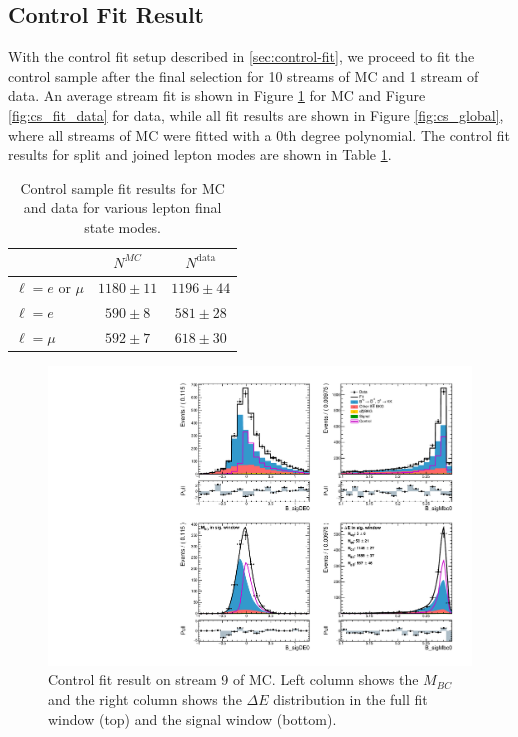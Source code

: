 \subsection{Control Fit Result}
With the control fit setup described in \ref{sec:control-fit}, we proceed to fit the control sample after the final selection for 10 streams of MC and 1 stream of data. An average stream fit is shown in Figure \ref{fig:cs_fit_mc} for MC and Figure \ref{fig:cs_fit_data} for data, while all fit results are shown in Figure \ref{fig:cs_global}, where all streams of MC were fitted with a 0th degree polynomial. The control fit results for split and joined lepton modes are shown in Table \ref{tab:cs_fit_yield}.

\begin{table}[H]
	\centering
	\begin{tabular}{|l|c|c|}
\hline
 & $N^{MC}$ & $N^{\mathrm{data}}$ \\
\hline
$\ell = e$ or $\mu$ & $1180 \pm 11$ & $1196 \pm 44$\\
	\hline
$\ell = e$ & $590 \pm 8$ & $581 \pm 28$ \\
\hline
$\ell = \mu$ & $592 \pm 7$ & $618 \pm 30$\\
	\hline
\end{tabular}
\caption{Control sample fit results for MC and data for various lepton final state modes.}
\label{tab:cs_fit_yield}
\end{table}

\begin{figure}[!htbp]
	\centering
	\captionsetup{width=0.8\linewidth}
	\includegraphics[width=\linewidth]{fig/cs_fit_mc}
	\caption{Control fit result on stream 9 of MC. Left column shows the $M_{BC}$ and the right column shows the $\Delta E$ distribution in the full fit window (top) and the signal window (bottom).}
	\label{fig:cs_fit_mc}
\end{figure}

